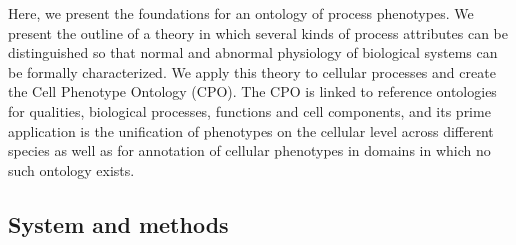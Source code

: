 \documentclass{bioinfo}
\renewcommand{\cite}{\citep}
\begin{document}
Here, we present the foundations for an ontology of process
phenotypes. We present the outline of a theory in which several kinds
of process attributes can be distinguished so that normal and abnormal
physiology of biological systems can be formally characterized. We
apply this theory to cellular processes and create the Cell Phenotype
Ontology (CPO). The CPO is linked to reference ontologies for
qualities, biological processes, functions and cell components, and
its prime application is the unification of phenotypes on the cellular
level across different species as well as for annotation of cellular
phenotypes in domains in which no such ontology exists.


\begin{methods}
\section{System and methods}



\end{methods}
\end{document}
